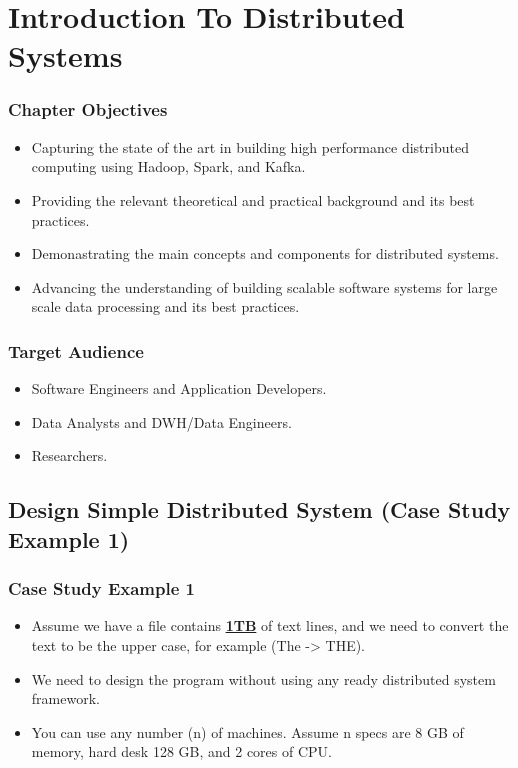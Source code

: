 \section{Introduction To Distributed Systems}


\begin{frame}
\frametitle{Chapter Objectives}

\begin{itemize} [<+->]
	\item Capturing the state of the art in building high performance distributed computing using Hadoop, Spark, and Kafka.
	\item Providing the relevant theoretical and practical background and its best practices.
	\item Demonastrating the main concepts and components for distributed systems. 
	\item Advancing the understanding of building scalable software systems for large scale data processing and its best practices. 
\end{itemize}

\end{frame}


\begin{frame}
	\frametitle{Target Audience}
	
	\begin{itemize} [<+->]
		\item Software Engineers and Application Developers.
		\item Data Analysts and DWH/Data Engineers.
		\item Researchers.
	\end{itemize}
	
\end{frame}

\subsection{Design Simple Distributed System (Case Study Example 1)}
\begin{frame}
	\frametitle{Case Study Example 1}
	\begin{itemize}  [<+->]
		\item Assume we have a file contains \textbf{\underline{1TB}} of text lines, and we need to convert the text to be the upper case, for example (The -> THE).
		\item We need to design the program without using any ready distributed system framework.
		\item You can use any number (n) of machines. Assume n specs are 8 GB of memory, hard desk 128 GB, and 2 cores of CPU.

	\end{itemize}
\end{frame}

